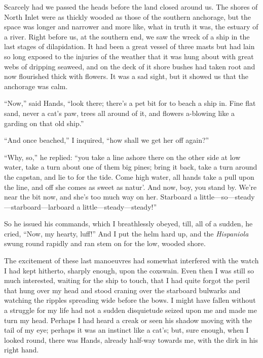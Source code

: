 Scarcely had we passed the heads before the land closed around us. The shores of North Inlet were as thickly wooded as those of the southern anchorage, but the space was longer and narrower and more like, what in truth it was, the estuary of a river. Right before us, at the southern end, we saw the wreck of a ship in the last stages of dilapidation. It had been a great vessel of three masts but had lain so long exposed to the injuries of the weather that it was hung about with great webs of dripping seaweed, and on the deck of it shore bushes had taken root and now flourished thick with flowers. It was a sad sight, but it showed us that the anchorage was calm.

\enquote{Now,} said Hands, \enquote{look there; there’s a pet bit for to beach a ship in. Fine flat sand, never a cat’s paw, trees all around of it, and flowers a-blowing like a garding on that old ship.}

\enquote{And once beached,} I inquired, \enquote{how shall we get her off again?}

\enquote{Why, so,} he replied: \enquote{you take a line ashore there on the other side at low water, take a turn about one of them big pines; bring it back, take a turn around the capstan, and lie to for the tide. Come high water, all hands take a pull upon the line, and off she comes as sweet as natur’. And now, boy, you stand by. We’re near the bit now, and she’s too much way on her. Starboard a little---so---steady---starboard---larboard a little---steady---steady!}

So he issued his commands, which I breathlessly obeyed, till, all of a sudden, he cried, \enquote{Now, my hearty, luff!} And I put the helm hard up, and the \textit{Hispaniola} swung round rapidly and ran stem on for the low, wooded shore.

The excitement of these last manoeuvres had somewhat interfered with the watch I had kept hitherto, sharply enough, upon the coxswain. Even then I was still so much interested, waiting for the ship to touch, that I had quite forgot the peril that hung over my head and stood craning over the starboard bulwarks and watching the ripples spreading wide before the bows. I might have fallen without a struggle for my life had not a sudden disquietude seized upon me and made me turn my head. Perhaps I had heard a creak or seen his shadow moving with the tail of my eye; perhaps it was an instinct like a cat’s; but, sure enough, when I looked round, there was Hands, already half-way towards me, with the dirk in his right hand.

